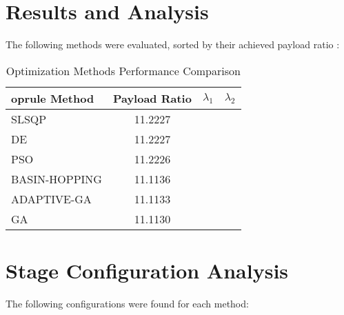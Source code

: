 \documentclass[11pt]{article}
\begin{document}
\section{Results and Analysis}
The following methods were evaluated, sorted by their achieved payload ratio \cite{pso_ascent_2013}:

\begin{table}[H]
\centering
\caption{Optimization Methods Performance Comparison}
\begin{tabular}{lccc}
	oprule
Method & Payload Ratio & $\lambda_{1}$ & $\lambda_{2}$ \\
\midrule
SLSQP & 11.2227 \\
DE & 11.2227 \\
PSO & 11.2226 \\
BASIN-HOPPING & 11.1136 \\
ADAPTIVE-GA & 11.1133 \\
GA & 11.1130 \\
\bottomrule
\end{tabular}
\end{table}

\section{Stage Configuration Analysis}
The following configurations were found for each method:
\end{document}

